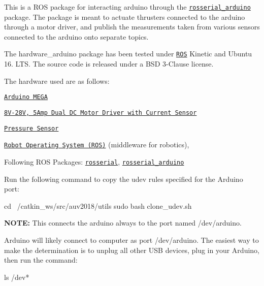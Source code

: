 This is a R\+OS package for interacting arduino through the \href{http://wiki.ros.org/rosserial_arduino}{\tt rosserial\+\_\+arduino} package. The package is meant to actuate thrusters connected to the arduino through a motor driver, and publish the measurements taken from various sensors connected to the arduino onto separate topics.

The {\ttfamily hardware\+\_\+arduino} package has been tested under \href{http://www.ros.org}{\tt R\+OS} Kinetic and Ubuntu 16. L\+TS. The source code is released under a B\+SD 3-\/\+Clause license.

The hardware used are as follows\+:
\begin{DoxyItemize}
\item \href{https://store.arduino.cc/usa/arduino-mega-2560-rev3}{\tt Arduino M\+E\+GA}
\item \href{http://www.nex-robotics.com/products/motor-drivers/8v-28v-5amp-dual-dc-motor-driver-with-current-sense.html}{\tt 8\+V-\/28V, 5\+Amp Dual DC Motor Driver with Current Sensor}
\item \href{https://www.bluerobotics.com/store/electronics/bar30-sensor-r1/}{\tt Pressure Sensor}
\end{DoxyItemize}


\begin{DoxyItemize}
\item \href{http://wiki.ros.org}{\tt Robot Operating System (R\+OS)} (middleware for robotics),
\item Following R\+OS Packages\+: \href{http://wiki.ros.org/rosserial}{\tt rosserial}, \href{http://wiki.ros.org/rosserial_arduino}{\tt rosserial\+\_\+arduino}
\end{DoxyItemize}

Run the following command to copy the udev rules specified for the Arduino port\+: 
\begin{DoxyCode}
cd ~/catkin\_ws/src/auv2018/utils
sudo bash clone\_udev.sh
\end{DoxyCode}


{\bfseries N\+O\+TE\+:} This connects the arduino always to the port named {\ttfamily /dev/arduino}.

Arduino will likely connect to computer as port {\ttfamily /dev/arduino}. The easiest way to make the determination is to unplug all other U\+SB devices, plug in your Arduino, then run the command\+: 
\begin{DoxyCode}
ls /dev*
\end{DoxyCode}


